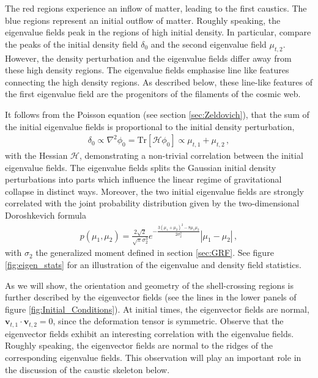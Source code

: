 \documentclass[a4paper, 11pt]{article}
\begin{document}
The red regions experience an inflow of matter, leading to the first caustics. The blue regions represent an initial outflow of matter. Roughly speaking, the eigenvalue fields peak in the regions of high initial density. In particular, compare the peaks of the initial density field $\delta_0$ and the second eigenvalue field $\mu_{t,2}$. However, the density perturbation and the eigenvalue fields differ away from these high density regions. The eigenvalue fields emphasise line like features connecting the high density regions. As described below, these line-like features of the first eigenvalue field are the progenitors of the filaments of the cosmic web. 

It follows from the Poisson equation (see section \ref{sec:Zeldovich}), that the sum of the initial eigenvalue fields is proportional to the initial density perturbation, 
\begin{align}
\delta_0 \propto \nabla^2 \phi_0 = \text{Tr}[\mathcal{H}\phi_0] \propto \mu_{t,1} + \mu_{t,2}\,,
\end{align}
with the Hessian $\mathcal{H}$, demonstrating a non-trivial correlation between the initial eigenvalue fields. The eigenvalue fields splits the Gaussian initial density perturbations into parts which influence the linear regime of gravitational collapse in distinct ways. Moreover, the two initial eigenvalue fields are strongly correlated with the joint probability distribution given by the two-dimensional Doroshkevich formula \cite{Doroshkevich:1970, Feldbrugge:2014}
\begin{align}
p(\mu_1,\mu_2) = \frac{2\sqrt{2}}{\sqrt{\pi} \sigma_2^3} e^{-\frac{3(\mu_1+\mu_2)^2-8\mu_1 \mu_2}{2 \sigma_2^2}}|\mu_1-\mu_2|\,,
\end{align}
with $\sigma_2$ the generalized moment defined in section \ref{sec:GRF}. See figure \ref{fig:eigen_stats} for an illustration of the eigenvalue and density field statistics. 

As we will show, the orientation and geometry of the shell-crossing regions is further described by the eigenvector fields (see the lines in the lower panels of figure \ref{fig:Initial_Conditions}). At initial times, the eigenvector fields are normal, $\bm{v}_{t,1}\cdot \bm{v}_{t,2}=0$, since the deformation tensor is symmetric. Observe that the eigenvector fields exhibit an interesting correlation with the eigenvalue fields. Roughly speaking, the eigenvector fields are normal to the ridges of the corresponding eigenvalue fields. This observation will play an important role in the discussion of the caustic skeleton below. 
\end{document}
